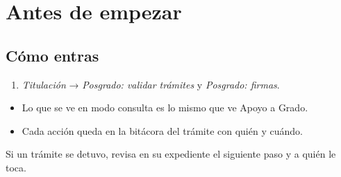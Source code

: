 \section{Antes de empezar}
\subsection*{Cómo entras}
\begin{enumerate}
  \item \emph{Titulación} → \emph{Posgrado: validar trámites} y \emph{Posgrado: firmas}.
\end{enumerate}
\begin{tencuenta}
\begin{itemize}
  \item Lo que se ve en modo consulta es lo mismo que ve Apoyo a Grado.
  \item Cada acción queda en la bitácora del trámite con quién y cuándo.
\end{itemize}
\end{tencuenta}
\begin{algosalemal}
Si un trámite se detuvo, revisa en su expediente el siguiente paso y a quién le toca.
\end{algosalemal}
